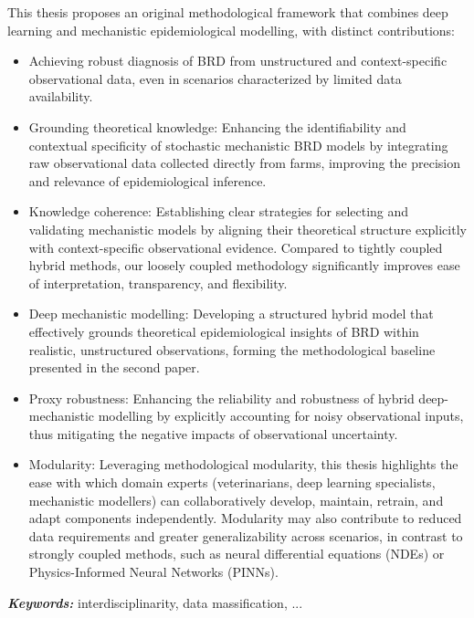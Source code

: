 This thesis proposes an original methodological framework that combines deep learning and mechanistic epidemiological modelling, with distinct contributions:
\begin{itemize}
    \item Achieving robust diagnosis of BRD from unstructured and context-specific observational data, even in scenarios characterized by limited data availability.
    \item Grounding theoretical knowledge: Enhancing the identifiability and contextual specificity of stochastic mechanistic BRD models by integrating raw observational data collected directly from farms, improving the precision and relevance of epidemiological inference.
    \item Knowledge coherence: Establishing clear strategies for selecting and validating mechanistic models by aligning their theoretical structure explicitly with context-specific observational evidence. Compared to tightly coupled hybrid methods, our loosely coupled methodology significantly improves ease of interpretation, transparency, and flexibility.
    \item Deep mechanistic modelling: Developing a structured hybrid model that effectively grounds theoretical epidemiological insights of BRD within realistic, unstructured observations, forming the methodological baseline presented in the second paper.
    \item Proxy robustness: Enhancing the reliability and robustness of hybrid deep-mechanistic modelling by explicitly accounting for noisy observational inputs, thus mitigating the negative impacts of observational uncertainty.
    \item Modularity: Leveraging methodological modularity, this thesis highlights the ease with which domain experts (veterinarians, deep learning specialists, mechanistic modellers) can collaboratively develop, maintain, retrain, and adapt components independently. Modularity may also contribute to reduced data requirements and greater generalizability across scenarios, in contrast to strongly coupled methods, such as neural differential equations (NDEs) or Physics-Informed Neural Networks (PINNs).
\end{itemize}


\textit{\textbf{Keywords:}} interdisciplinarity, data massification, ...


